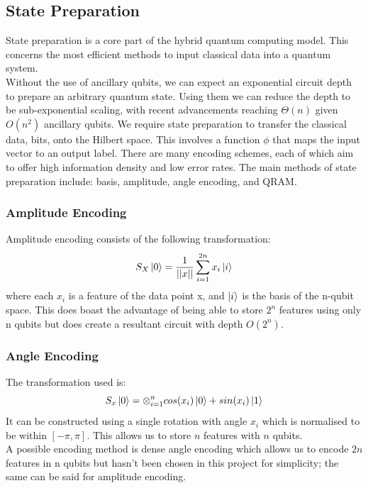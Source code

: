 \documentclass[12pt]{article}
\numberwithin{equation}{section}
\begin{document}
\subsection{State Preparation}
State preparation is a core part of the hybrid quantum computing model. This 
concerns the most efficient methods to input classical data into a quantum system.
\\
Without the use of ancillary qubits, we can expect an exponential circuit depth
to prepare an arbitrary quantum state. Using them we can reduce the depth to be 
sub-exponential scaling, with recent advancements reaching $\Theta(n)$ given $O(n^2)$
ancillary qubits.
\cite{stateprep1}
\cite{stateprep2}
We require state preparation to transfer the classical data, bits, onto the 
Hilbert space. This involves a function $\phi$ that maps the input vector to 
an output label. There are many encoding schemes, each of which aim to offer 
high information density and low error rates.
The main methods of state preparation include: basis, amplitude, angle encoding,
and QRAM. 

\subsubsection{Amplitude Encoding}
Amplitude encoding consists of the following transformation:\\
\begin{equation}
S_X \ket{0} = \frac{1}{||x||}\sum^{2n}_{i=1}{x_i\ket{i}}
\end{equation}
where each $x_i$ is a feature of the data point x, and $\ket{i}$ is the basis 
of the n-qubit
space. This does boast the advantage of being able to store $2^n$ features using 
only n qubits but does create a resultant circuit with depth $O(2^n)$.

\subsubsection{Angle Encoding}
The transformation used is:
\begin{equation}
S_x\ket{0} = \otimes^n_{i=1} cos(x_i)\ket{0} + sin(x_i)\ket{1}
\end{equation}
It can be constructed using a single rotation with angle $x_i$ which is 
normalised to be within $[-\pi,\pi]$. This allows us to store $n$ features with 
$n$ qubits.
\\
A possible encoding method is dense angle encoding which allows us to encode $2n$ 
features in n qubits but hasn't been chosen in this project for simplicity; the 
same can be said for amplitude encoding.
\end{document}
